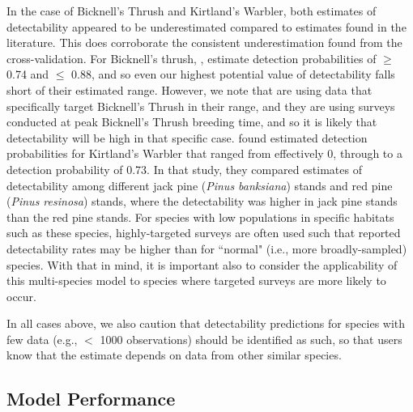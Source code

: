 \documentclass[12pt]{article}
\begin{document}
\par In the case of Bicknell's Thrush and Kirtland's Warbler, both estimates of detectability appeared to be underestimated compared to estimates found in the literature.
This does corroborate the consistent underestimation found from the cross-validation.
For Bicknell's thrush, \citet{aubry_bicknells_2018}, estimate detection probabilities of $\geq$ 0.74 and $\leq$ 0.88, and so even our highest potential value of detectability falls short of their estimated range.
However, we note that \citet{aubry_bicknells_2018} are using data that specifically target Bicknell's Thrush in their range, and they are using surveys conducted at peak Bicknell's Thrush breeding time, and so it is likely that detectability will be high in that specific case.
\citet{van_dyke_comparative_2022} found estimated detection probabilities for Kirtland’s Warbler that ranged from effectively 0, through to a detection probability of 0.73.
In that study, they compared estimates of detectability among different jack pine (\textit{Pinus banksiana}) stands and red pine (\textit{Pinus resinosa}) stands, where the detectability was higher in jack pine stands than the red pine stands.
For species with low populations in specific habitats such as these species, highly-targeted surveys are often used such that reported detectability rates may be higher than for ``normal" (i.e., more broadly-sampled) species.
With that in mind, it is important also to consider the applicability of this multi-species model to species where targeted surveys are more likely to occur.

In all cases above, we also caution that detectability predictions for species with few data (e.g., $<$ 1000 observations) should be identified as such, so that users know that the estimate depends on data from other similar species.


\subsection{Model Performance}
\end{document}
